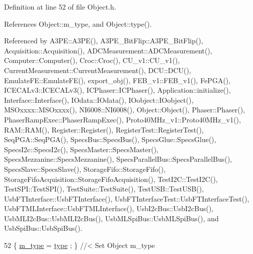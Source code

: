 Definition at line 52 of file Object.\+h.



References Object\+::m\+\_\+type, and Object\+::type().



Referenced by A3\+P\+E\+::\+A3\+P\+E(), A3\+P\+E\+\_\+\+Bit\+Flip\+::\+A3\+P\+E\+\_\+\+Bit\+Flip(), Acquisition\+::\+Acquisition(), A\+D\+C\+Measurement\+::\+A\+D\+C\+Measurement(), Computer\+::\+Computer(), Croc\+::\+Croc(), C\+U\+\_\+v1\+::\+C\+U\+\_\+v1(), Current\+Measurement\+::\+Current\+Measurement(), D\+C\+U\+::\+D\+C\+U(), Emulate\+F\+E\+::\+Emulate\+F\+E(), export\+\_\+obj(), F\+E\+B\+\_\+v1\+::\+F\+E\+B\+\_\+v1(), Fe\+P\+G\+A(), I\+C\+E\+C\+A\+Lv3\+::\+I\+C\+E\+C\+A\+Lv3(), I\+C\+Phaser\+::\+I\+C\+Phaser(), Application\+::initialize(), Interface\+::\+Interface(), I\+Odata\+::\+I\+Odata(), I\+Oobject\+::\+I\+Oobject(), M\+S\+Oxxxx\+::\+M\+S\+Oxxxx(), N\+I6008\+::\+N\+I6008(), Object\+::\+Object(), Phaser\+::\+Phaser(), Phaser\+Ramp\+Exec\+::\+Phaser\+Ramp\+Exec(), Proto40\+M\+Hz\+\_\+v1\+::\+Proto40\+M\+Hz\+\_\+v1(), R\+A\+M\+::\+R\+A\+M(), Register\+::\+Register(), Register\+Test\+::\+Register\+Test(), Seq\+P\+G\+A\+::\+Seq\+P\+G\+A(), Specs\+Bus\+::\+Specs\+Bus(), Specs\+Glue\+::\+Specs\+Glue(), Specs\+I2c\+::\+Specs\+I2c(), Specs\+Master\+::\+Specs\+Master(), Specs\+Mezzanine\+::\+Specs\+Mezzanine(), Specs\+Parallel\+Bus\+::\+Specs\+Parallel\+Bus(), Specs\+Slave\+::\+Specs\+Slave(), Storage\+Fifo\+::\+Storage\+Fifo(), Storage\+Fifo\+Acquisition\+::\+Storage\+Fifo\+Acquisition(), Test\+I2\+C\+::\+Test\+I2\+C(), Test\+S\+P\+I\+::\+Test\+S\+P\+I(), Test\+Suite\+::\+Test\+Suite(), Test\+U\+S\+B\+::\+Test\+U\+S\+B(), Usb\+F\+T\+Interface\+::\+Usb\+F\+T\+Interface(), Usb\+F\+T\+Interface\+Test\+::\+Usb\+F\+T\+Interface\+Test(), Usb\+F\+T\+M\+L\+Interface\+::\+Usb\+F\+T\+M\+L\+Interface(), Usb\+I2c\+Bus\+::\+Usb\+I2c\+Bus(), Usb\+M\+L\+I2c\+Bus\+::\+Usb\+M\+L\+I2c\+Bus(), Usb\+M\+L\+Spi\+Bus\+::\+Usb\+M\+L\+Spi\+Bus(), and Usb\+Spi\+Bus\+::\+Usb\+Spi\+Bus().


\begin{DoxyCode}
52 \{ \hyperlink{classObject_a457a600fe8c00eb1034374f75110a78c}{m\_type}  = \hyperlink{classObject_a84f99f70f144a83e1582d1d0f84e4e62}{type}  ; \} \textcolor{comment}{//< Set Object m\_type}
\end{DoxyCode}
\mbox{\label{classFePGA_aa0657c6ef809f3f6b54613f237750cc4}} 
